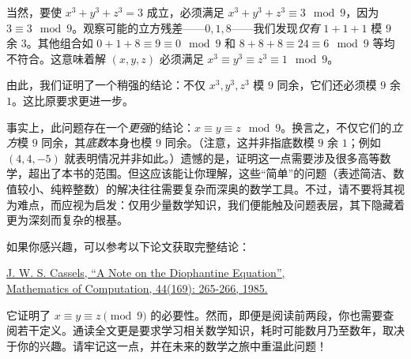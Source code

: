 \begin{example}
    当然，要使 $x^3 + y^3 + z^3 = 3$ 成立，必须满足 $x^3 + y^3 + z^3 \equiv 3 \mod{9}$，因为 $3 \equiv 3 \mod{9}$。观察可能的立方残差——$0, 1, 8$——我们发现\emph{仅有} $1 + 1 + 1$ 模 $9$ 余 $3$。其他组合如 $0 + 1 + 8 \equiv 9 \equiv 0 \mod{9}$ 和 $8 + 8 + 8 \equiv 24 \equiv 6 \mod{9}$ 等均不符合。这意味着解 $(x, y, z)$ 必须满足 $x^3 \equiv y^3 \equiv z^3 \equiv 1 \mod{9}$。

    由此，我们证明了一个稍强的结论：不仅 $x^3, y^3, z^3$ 模 $9$ 同余，它们还必须模 $9$ 余 $1$。这比原要求更进一步。

    事实上，此问题存在一个\emph{更强}的结论：$x \equiv y \equiv z \mod{9}$。换言之，不仅它们的\emph{立方}模 $9$ 同余，其\emph{底数}本身也模 $9$ 同余。（注意，这并非指底数模 $9$ 余 $1$；例如 $(4, 4, -5)$ 就表明情况并非如此。）遗憾的是，证明这一点需要涉及很多高等数学，超出了本书的范围。但这应该能让你理解，这些``简单''的问题（表述简洁、数值较小、纯粹整数）的解决往往需要复杂而深奥的数学工具。不过，请不要将其视为难点，而应视为启发：仅用少量数学知识，我们便能触及问题表层，其下隐藏着更为深刻而复杂的根基。

    如果你感兴趣，可以参考以下论文获取完整结论：
    \begin{center}
        \href{http://www.ams.org/journals/mcom/1985-44-169/S0025-5718-1985-0771049-4/S0025-5718-1985-0771049-4.pdf}{J. W. S. Cassels, ``A Note on the Diophantine Equation'', \\Mathematics of Computation, 44(169): 265-266, 1985.}
    \end{center}
    
    它证明了 $x \equiv y \equiv z \pmod{9}$ 的必要性。然而，即便是阅读前两段，你也需要查阅若干定义。通读全文更是要求学习相关数学知识，耗时可能数月乃至数年，取决于你的兴趣。请牢记这一点，并在未来的数学之旅中重温此问题！
\end{example}
